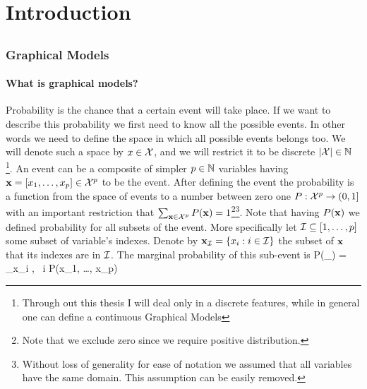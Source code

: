 
\chapter{Introduction} %

\label{intro} %


\newcommand{\keyword}[1]{\textbf{#1}}
\newcommand{\tabhead}[1]{\textbf{#1}}
\newcommand{\code}[1]{\texttt{#1}}
\newcommand{\file}[1]{\texttt{\bfseries#1}}
\newcommand{\option}[1]{\texttt{\itshape#1}}

\section{}
\subsection{Graphical Models}
\subsubsection{What is graphical models?}
Probability is the chance that a certain event will take place.
If we want to describe this probability we first need to know all the possible events.
In other words we need to define the space in which all possible events belongs too.
We will denote such a space by $x \in {\cal X}$, and we will restrict it to be discrete $ |{\cal X}| \in \mathbb{N}$
\footnote{Through out this thesis I will deal only in a discrete features, while in general one can define a continuous Graphical Models}.
An event can be a composite of simpler $p \in \mathbb{N}$ variables having ${\bf x} = [x_1, \ldots, x_{p}] \in {\cal X}^p$ to be the event.
After defining the event the probability is  a function from the space of events to a number between zero one $P:{\cal X}^{p} \to (0,1]$ with an important restriction that $\sum_{{\bf x} \in {\cal X}^{p}} P({\bf x}) = 1$\footnote{Note that we exclude zero since we require positive distribution.}\footnote{Without loss of generality for ease of notation we assumed that all variables have the same domain. This assumption can be easily removed.}.
Note that having $P({\bf x})$ we defined probability for all subsets of the event.
More specifically let $ {\cal I} \subseteq [1, \ldots,p]$ some subset of variable's indexes. Denote by ${\bf x}_{{\cal I}} = \{x_i : i \in {\cal I}\}$ the subset of ${\bf x}$ that its indexes are in ${\cal I}$.  
The marginal probability of this sub-event is 
\be
\label{eq:MAR}
P(\xx_{\cI}) = \sum_{x_i \in \cX, \forall\ i \in [1,\ldots p] \setminus \cI} P(x_1, \ldots, x_p)
\ee


